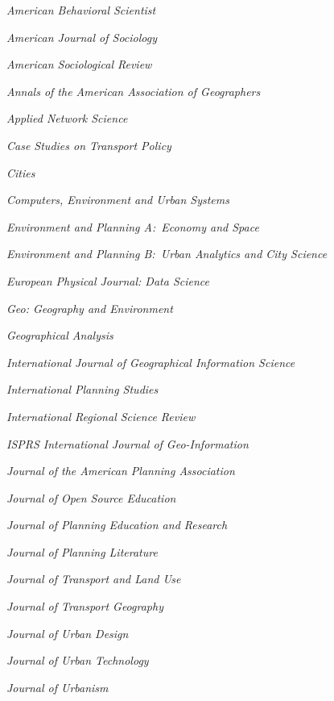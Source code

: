 \documentclass[12pt,letterpaper]{report}
\newcommand{\listitemspace}{0.25em}
\renewenvironment{itemize}
{\begin{list}{}{\setlength{\leftmargin}{0em}
                \setlength{\parskip}{0em}
                \setlength{\itemsep}{\listitemspace}
                \setlength{\parsep}{\listitemspace}}}
{\end{list}}
\begin{document}
    \begin{itemize}

        \item \textit{American Behavioral Scientist}
        \item \textit{American Journal of Sociology}
        \item \textit{American Sociological Review}
        \item \textit{Annals of the American Association of Geographers}
        \item \textit{Applied Network Science}
        \item \textit{Case Studies on Transport Policy}
        \item \textit{Cities}
        \item \textit{Computers, Environment and Urban Systems}
        \item \textit{Environment and Planning A:\ Economy and Space}
        \item \textit{Environment and Planning B:\ Urban Analytics and City Science}
        \item \textit{European Physical Journal: Data Science}
        \item \textit{Geo: Geography and Environment}
        \item \textit{Geographical Analysis}
        \item \textit{International Journal of Geographical Information Science}
        \item \textit{International Planning Studies}
        \item \textit{International Regional Science Review}
        \item \textit{ISPRS International Journal of Geo-Information}
        \item \textit{Journal of the American Planning Association}
        \item \textit{Journal of Open Source Education}
        \item \textit{Journal of Planning Education and Research}
        \item \textit{Journal of Planning Literature}
        \item \textit{Journal of Transport and Land Use}
        \item \textit{Journal of Transport Geography}
        \item \textit{Journal of Urban Design}
        \item \textit{Journal of Urban Technology}
        \item \textit{Journal of Urbanism}

\end{itemize}
\end{document}
